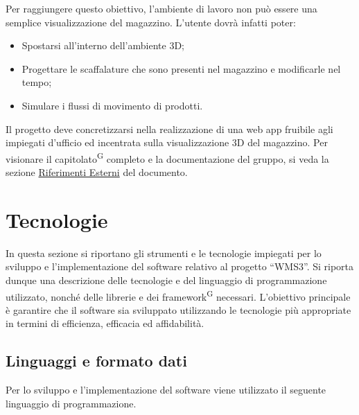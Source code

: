 Per raggiungere questo obiettivo, l'ambiente di lavoro non può essere una semplice visualizzazione del magazzino. L'utente dovrà infatti poter:
\begin{itemize}
    \item Spostarsi all'interno dell'ambiente 3D;
    \item Progettare le scaffalature che sono presenti nel magazzino e modificarle nel tempo;
    \item Simulare i flussi di movimento di prodotti.
\end{itemize}

Il progetto deve concretizzarsi nella realizzazione di una web app fruibile agli impiegati d'ufficio ed incentrata sulla visualizzazione 3D del magazzino.
Per visionare il capitolato\textsuperscript{G} completo e la documentazione del gruppo, si veda la sezione \hyperref[sec:ref_esterni]{Riferimenti Esterni} 
del documento.

\section{Tecnologie}\label{sec:tecnologie}
In questa sezione si riportano gli strumenti e le tecnologie impiegati per lo sviluppo e l’implementazione del software relativo al progetto ``WMS3''.
Si riporta dunque una descrizione delle tecnologie e del linguaggio di programmazione utilizzato, nonché delle librerie e dei framework\textsuperscript{G} necessari.
L’obiettivo principale è garantire che il software sia sviluppato utilizzando le tecnologie più appropriate in termini di efficienza, efficacia ed affidabilità.

\subsection{Linguaggi e formato dati}
Per lo sviluppo e l'implementazione del software viene utilizzato il seguente linguaggio di programmazione.


